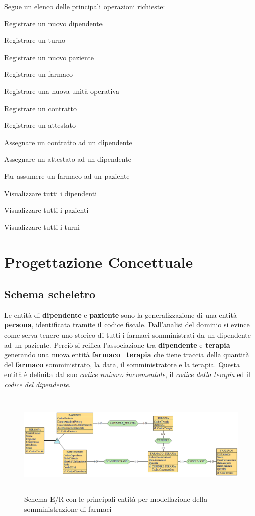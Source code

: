 \documentclass[a4paper, 12pt]{report}
\newenvironment{packed_enum}{
\begin{enumerate}
        \setlength{\itemsep}{1pt}
        \setlength{\parskip}{0pt}
        \setlength{\parsep}{0pt}
}{\end{enumerate}}
\begin{document}
Segue un elenco delle principali operazioni richieste:
\begin{packed_enum}
        \item Registrare un nuovo dipendente
        \item Registrare un turno
        \item Registrare un nuovo paziente
        \item Registrare un farmaco
        \item Registrare una nuova unità operativa
        \item Registrare un contratto
        \item Registrare un attestato
        \item Assegnare un contratto ad un dipendente
        \item Assegnare un attestato ad un dipendente
        \item Far assumere un farmaco ad un paziente
        \item Visualizzare tutti i dipendenti
        \item Visualizzare tutti i pazienti
        \item Visualizzare tutti i turni
\end{packed_enum}

\chapter{Progettazione Concettuale}

\section{Schema scheletro}
Le entità di \textbf{dipendente} e \textbf{paziente} sono la generalizzazione di una entità \textbf{persona}, identificata
tramite il codice fiscale. Dall'analisi del dominio si evince come serva tenere uno storico di tutti i farmaci somministrati
da un dipendente ad un paziente. Perciò si reifica l'associazione tra \textbf{dipendente} e \textbf{terapia} generando
una nuova entità \textbf{farmaco\_terapia} che tiene traccia della quantità del \textbf{farmaco} somministrato, la data, 
il somministratore e la terapia. Questa entità è definita dal suo \textit{codice univoco incrementale}, il \textit{codice della terapia} ed 
il \textit{codice del dipendente}.

\begin{figure}[H]
        \centering
        \includegraphics[height=5cm]{img/dipendentePazienteER.png}
        \caption{Schema E/R con le principali entità per modellazione della somministrazione di farmaci}
    \end{figure}
\end{document}
